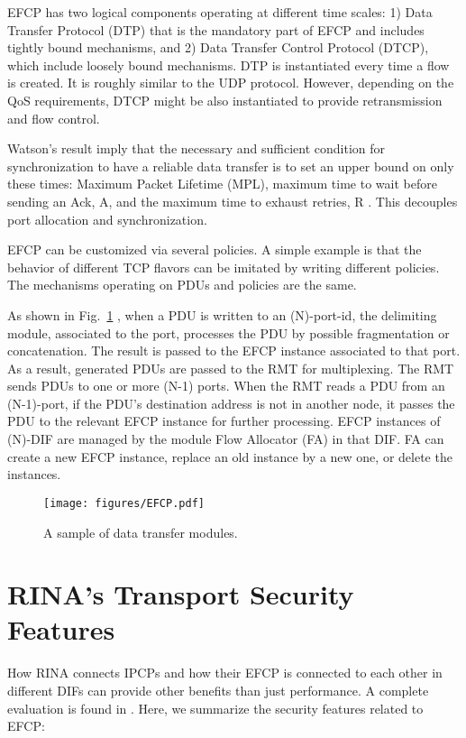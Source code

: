\documentclass{ieeeaccess}
\begin{document}
EFCP has two logical components operating at different time scales: 1) Data Transfer Protocol (DTP) that is the mandatory part of EFCP and includes tightly bound mechanisms, and 2) Data Transfer Control Protocol (DTCP), which include loosely bound mechanisms. DTP is instantiated every time a flow is created. It is roughly similar to the UDP protocol. However, depending on the QoS requirements, DTCP might be also instantiated to provide retransmission and flow control.

Watson's result imply that the necessary and sufficient condition for synchronization to have a reliable data transfer is to set an upper bound on only these times: Maximum Packet Lifetime (MPL), maximum time to wait before sending an Ack, A, and the maximum time to exhaust retries, R \cite{watson1981timer}. This decouples port allocation and synchronization.

EFCP can be customized via several policies. A simple example is that the behavior of different TCP flavors can be imitated by writing different policies. The mechanisms operating on PDUs and policies are the same.

As shown in Fig.~\ref{fig:rina-efcp} , when a PDU is written to an (N)-port-id, the delimiting module, associated to the port, processes the PDU by possible fragmentation or concatenation. The result is passed to the EFCP instance associated to that port. As a result, generated PDUs are passed to the RMT for multiplexing. The RMT sends PDUs to one or more (N-1) ports. When the RMT reads a PDU from an (N-1)-port, if the PDU's destination address is not in another node, it passes the PDU to the relevant EFCP instance for further processing. EFCP instances of (N)-DIF are managed by the module Flow Allocator (FA) in that DIF. FA can create a new EFCP instance, replace an old instance by a new one, or delete the instances.

\begin{figure}
	\centering
	\texttt{[image: figures/EFCP.pdf]}
	\caption{A sample of data transfer modules.}
	\label{fig:rina-efcp}
\end{figure}


\section{RINA's Transport Security Features} \label{sec:rina-trans}
How RINA connects IPCPs and how their EFCP is connected to each other in different DIFs can provide other benefits than just performance. A complete evaluation is found in \cite{ramezanifarkhani2018securing,small2012}. Here, we summarize the security features related to EFCP:
\end{document}
